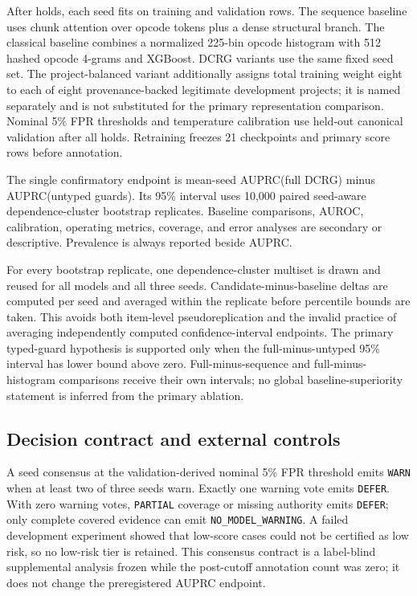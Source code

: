 \documentclass[conference]{IEEEtran}
\newcommand{\code}[1]{\texttt{#1}}
\begin{document}
After holds, each seed fits on \FrozenTrainRows{} training and \FrozenValidationRows{} validation
rows. The sequence baseline uses
chunk attention over opcode tokens plus a dense structural branch. The classical baseline combines
a normalized 225-bin opcode histogram with 512 hashed opcode 4-grams and XGBoost. DCRG variants use
the same fixed seed set. The project-balanced variant additionally assigns total training weight
eight to each of eight provenance-backed legitimate development projects; it is named separately
and is not substituted for the primary representation comparison. Nominal 5\% FPR thresholds and
temperature calibration use held-out canonical validation after all holds. Retraining freezes 21
\FrozenCheckpoints{} checkpoints and \FrozenPredictionRows{} primary score rows before annotation.

The single confirmatory endpoint is mean-seed AUPRC(full DCRG) minus AUPRC(untyped guards). Its 95\%
interval uses 10,000 paired seed-aware dependence-cluster bootstrap replicates. Baseline comparisons,
AUROC, calibration, operating metrics, coverage, and error analyses are secondary or descriptive.
Prevalence is always reported beside AUPRC.

For every bootstrap replicate, one dependence-cluster multiset is drawn and reused for all models
and all three seeds. Candidate-minus-baseline deltas are computed per seed and averaged within the
replicate before percentile bounds are taken. This avoids both item-level pseudoreplication and the
invalid practice of averaging independently computed confidence-interval endpoints. The primary
typed-guard hypothesis is supported only when the full-minus-untyped 95\% interval has lower bound
above zero. Full-minus-sequence and full-minus-histogram comparisons receive their own intervals;
no global baseline-superiority statement is inferred from the primary ablation.

\subsection{Decision contract and external controls}

A seed consensus at the validation-derived nominal 5\% FPR threshold emits \code{WARN} when at
least two of three seeds warn. Exactly one warning vote emits \code{DEFER}. With zero warning votes,
\code{PARTIAL} coverage or missing authority emits \code{DEFER}; only complete covered evidence can
emit \code{NO\_MODEL\_WARNING}. A failed development experiment showed that low-score cases could
not be certified as low risk, so no low-risk tier is retained.
This consensus contract is a label-blind supplemental analysis frozen while the post-cutoff
annotation count was zero; it does not change the preregistered AUPRC endpoint.
\end{document}

